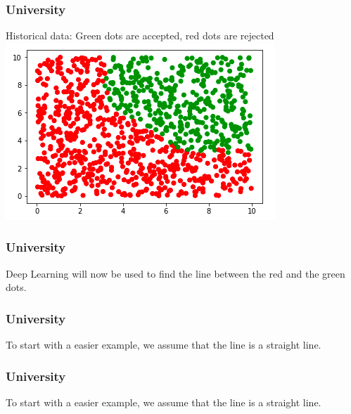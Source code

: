 \begin{frame}[fragile]
  \frametitle{University}
  Historical data: Green dots are accepted, red dots are rejected\\
  \vspace{3mm}
  \includegraphics[scale=0.4]{img/uni_data}
\end{frame}

\begin{frame}[fragile]
  \frametitle{University}
  Deep Learning will now be used to find the line between the red and the green dots.
\end{frame}

\begin{frame}[fragile]
  \frametitle{University}
  To start with a easier example, we assume that the line is a straight line.
\end{frame}

\begin{frame}[fragile]
  \frametitle{University}
  To start with a easier example, we assume that the line is a straight line.
\end{frame}


